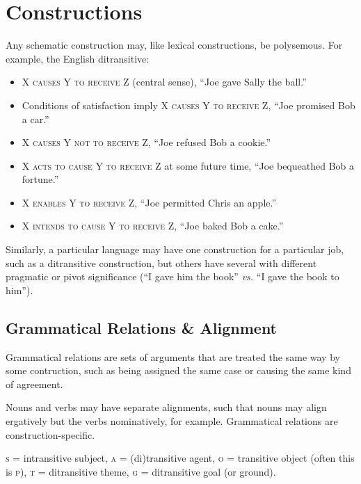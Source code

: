 \documentclass[11pt]{article}
\newcommand{\I}[1]{\textsc{#1}}   %
\newenvironment{grammarlist}%
 {\begin{itemize}\addtolength{\itemsep}{-0.5\baselineskip}\ignorespaces}%
 {\end{itemize}\ignorespacesafterend}
\begin{document}

\section{Constructions}
Any schematic construction may, like lexical constructions, be
polysemous.  For example, the English ditransitive:

\begin{grammarlist}
  \item \I{X causes Y to receive Z} (central sense), ``Joe gave Sally
    the ball.''
  \item Conditions of satisfaction imply \I{X causes Y to receive Z},
    ``Joe promised Bob a car.''
  \item \I{X causes Y not to receive Z}, ``Joe refused Bob a cookie.''
  \item \I{X acts to cause Y to receive Z} at some future time, ``Joe
    bequeathed Bob a fortune.''
  \item \I{X enables Y to receive Z}, ``Joe permitted Chris an
    apple.''
  \item \I{X intends to cause Y to receive Z}, ``Joe baked Bob a cake.''
\end{grammarlist}

Similarly, a particular language may have one construction for a
particular job, such as a ditransitive construction, but others have
several with different pragmatic or pivot significance (``I gave him
the book'' \textit{vs.} ``I gave the book to him'').


\subsection{Grammatical Relations \& Alignment}
Grammatical relations are sets of arguments that are treated the same
way by some contruction, such as being assigned the same case or
causing the same kind of agreement.

Nouns and verbs may have separate alignments, such that nouns may
align ergatively but the verbs nominatively, for example.  Grammatical
relations are construction-specific.

\I{s} = intransitive subject, \I{a} = (di)transitive agent, \I{o} =
transitive object (often this is \I{p}), \I{t} = ditransitive theme,
\I{g} = ditransitive goal (or ground).
\end{document}

